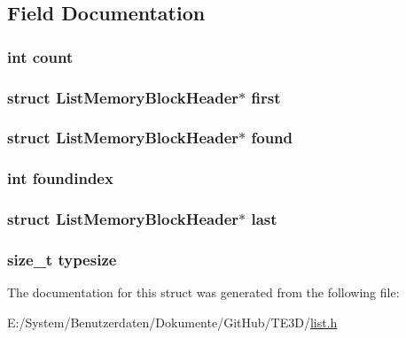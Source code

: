 \subsection{Field Documentation}
\hypertarget{struct_list_ad43c3812e6d13e0518d9f8b8f463ffcf}{
\subsubsection[{count}]{\setlength{\rightskip}{0pt plus 5cm}int count}}\label{struct_list_ad43c3812e6d13e0518d9f8b8f463ffcf}
\hypertarget{struct_list_aad341c9d11e18ba0ff4abe71e916bf4c}{
\subsubsection[{first}]{\setlength{\rightskip}{0pt plus 5cm}struct {\bf List\-Memory\-Block\-Header}$\ast$ first}}\label{struct_list_aad341c9d11e18ba0ff4abe71e916bf4c}
\hypertarget{struct_list_ad2024b5b87cb5f5fb344d1838c49b77f}{
\subsubsection[{found}]{\setlength{\rightskip}{0pt plus 5cm}struct {\bf List\-Memory\-Block\-Header}$\ast$ found}}\label{struct_list_ad2024b5b87cb5f5fb344d1838c49b77f}
\hypertarget{struct_list_a6f582e298e6ce683da843212054a65bc}{
\subsubsection[{foundindex}]{\setlength{\rightskip}{0pt plus 5cm}int foundindex}}\label{struct_list_a6f582e298e6ce683da843212054a65bc}
\hypertarget{struct_list_a512a4382e503046b144aef2735fe7f9d}{
\subsubsection[{last}]{\setlength{\rightskip}{0pt plus 5cm}struct {\bf List\-Memory\-Block\-Header}$\ast$ last}}\label{struct_list_a512a4382e503046b144aef2735fe7f9d}
\hypertarget{struct_list_aae15b6d77b58dbd6f21861d1320ec961}{
\subsubsection[{typesize}]{\setlength{\rightskip}{0pt plus 5cm}size\-\_\-t typesize}}\label{struct_list_aae15b6d77b58dbd6f21861d1320ec961}


The documentation for this struct was generated from the following file\-:\begin{DoxyCompactItemize}
\item 
E\-:/\-System/\-Benutzerdaten/\-Dokumente/\-Git\-Hub/\-T\-E3\-D/\hyperlink{list_8h}{list.\-h}\end{DoxyCompactItemize}
